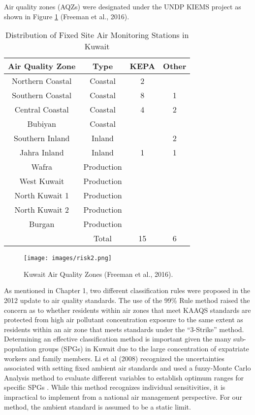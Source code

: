 Air quality zones (AQZs) were designated under the UNDP KIEMS project as shown in Figure \ref{fig2:aqzkuwait} (Freeman et al., 2016).
%
\begin{table}[H]
\centering
\caption{Distribution of Fixed Site Air Monitoring Stations in Kuwait}
\label{tb:2ams}
\begin{tabular}{@{}cccc@{}}
\toprule
\textbf{Air Quality Zone} & \textbf{Type} & \textbf{KEPA} & \textbf{Other} \\ \midrule
Northern Coastal & Coastal & 2 &  \\
Southern Coastal & Coastal & 8 & 1 \\
Central Coastal & Coastal & 4 & 2 \\
Bubiyan & Coastal &  &  \\
Southern Inland & Inland &  & 2 \\
Jahra Inland & Inland & 1 & 1 \\
Wafra & Production &  &  \\
West Kuwait & Production &  &  \\
North Kuwait 1 & Production &  &  \\
North Kuwait 2 & Production &  &  \\
Burgan & Production &  &  \\
 & Total & 15 & 6 \\ \bottomrule
\end{tabular}
\end{table}

%  
\begin{figure}[H]
\texttt{[image: images/risk2.png]} 
\caption[Kuwait Air Quality Zones]{Kuwait Air Quality Zones (Freeman et al., 2016).}
\label{fig2:aqzkuwait}
\end{figure}

As mentioned in Chapter 1, two different classification rules were proposed in the 2012 update to air quality standards. The use of the 99\% Rule method raised the concern as to whether residents within air zones that meet KAAQS standards are protected from high air pollutant concentration exposure to the same extent as residents within an air zone that meets standards under the ``3-Strike” method. Determining an effective classification method is important given the many sub-population groups (SPGs) in Kuwait due to the large concentration of expatriate workers and family members. Li et al (2008) recognized the uncertainties associated with setting fixed ambient air standards and used a fuzzy-Monte Carlo Analysis method to evaluate different variables to establish optimum ranges for specific SPGs \citep{Li2008}. While this method recognizes individual sensitivities, it is impractical to implement from a national air management perspective. For our method, the ambient standard is assumed to be a static limit.

